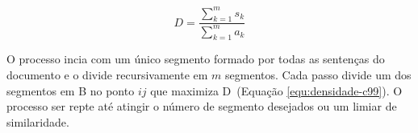 \documentclass[10pt,a4paper]{article}
\begin{document}
\begin{equation}
D = \frac{\sum_{k=1}^m s_k}{\sum_{k=1}^m a_k}
\label{equ:densidade-c99}
\end{equation}





O processo incia com um único segmento formado por todas as sentenças do documento e o divide recursivamente em $m$ segmentos. Cada passo divide um dos segmentos em B no ponto $ij$ que maximiza D~(Equação \ref{equ:densidade-c99}). O processo ser repte até atingir o número de segmento desejados ou um limiar de similaridade.
 



\end{document}
